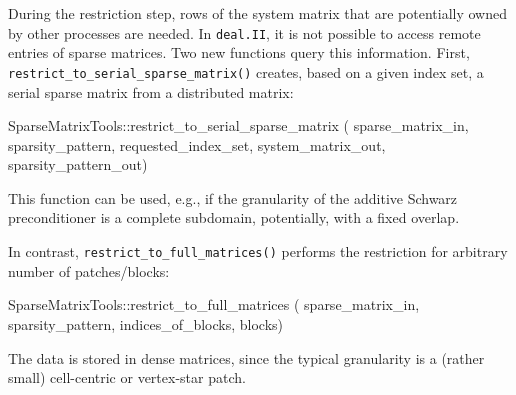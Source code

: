 \documentclass{ansarticle-preprint}
\newcommand{\specialword}[1]{\texttt{#1}}
\newcommand{\dealii}{{\specialword{deal.II}}\xspace}
\begin{document}
\begin{itemize}
  During the restriction step,
  rows of the system matrix that are potentially owned by other
  processes are needed.  In \dealii, it is not possible to access remote entries
  of sparse matrices. Two new functions query this information. First,
  \texttt{restrict\_to\_serial\_sparse\_matrix()} creates, based
  on a given index set, a serial
  sparse matrix from a distributed matrix:
\begin{c++}
SparseMatrixTools::restrict_to_serial_sparse_matrix (
  sparse_matrix_in, sparsity_pattern, requested_index_set,
  system_matrix_out, sparsity_pattern_out)
\end{c++}
This function can be used, e.g., if the granularity of the additive Schwarz preconditioner
is a complete subdomain, potentially, with a fixed overlap.

In contrast, \texttt{restrict\_to\_full\_matrices()} performs the restriction
for arbitrary number of patches/blocks:

\begin{c++}
SparseMatrixTools::restrict_to_full_matrices (
  sparse_matrix_in, sparsity_pattern, indices_of_blocks, blocks)
\end{c++}

The data is stored in dense matrices, since the typical granularity is a (rather small) cell-centric or
vertex-star patch.


\end{itemize}
\end{document}
